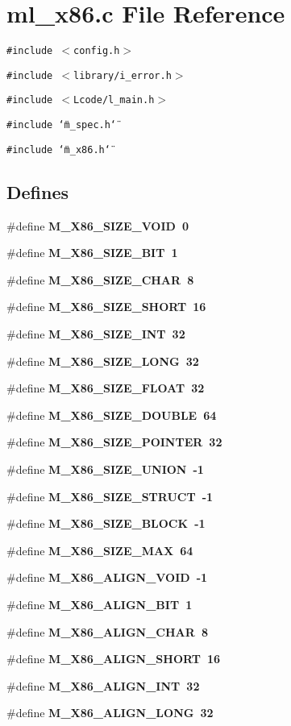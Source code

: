 \section{ml\_\-x86.c File Reference}
\label{ml__x86_8c}
{\tt \#include $<$config.h$>$}\par
{\tt \#include $<$library/i\_\-error.h$>$}\par
{\tt \#include $<$Lcode/l\_\-main.h$>$}\par
{\tt \#include \char`\"{}m\_\-spec.h\char`\"{}}\par
{\tt \#include \char`\"{}m\_\-x86.h\char`\"{}}\par
\subsection*{Defines}
\begin{CompactItemize}
\item 
\#define \bf{M\_\-X86\_\-SIZE\_\-VOID}~0
\item 
\#define \bf{M\_\-X86\_\-SIZE\_\-BIT}~1
\item 
\#define \bf{M\_\-X86\_\-SIZE\_\-CHAR}~8
\item 
\#define \bf{M\_\-X86\_\-SIZE\_\-SHORT}~16
\item 
\#define \bf{M\_\-X86\_\-SIZE\_\-INT}~32
\item 
\#define \bf{M\_\-X86\_\-SIZE\_\-LONG}~32
\item 
\#define \bf{M\_\-X86\_\-SIZE\_\-FLOAT}~32
\item 
\#define \bf{M\_\-X86\_\-SIZE\_\-DOUBLE}~64
\item 
\#define \bf{M\_\-X86\_\-SIZE\_\-POINTER}~32
\item 
\#define \bf{M\_\-X86\_\-SIZE\_\-UNION}~-1
\item 
\#define \bf{M\_\-X86\_\-SIZE\_\-STRUCT}~-1
\item 
\#define \bf{M\_\-X86\_\-SIZE\_\-BLOCK}~-1
\item 
\#define \bf{M\_\-X86\_\-SIZE\_\-MAX}~64
\item 
\#define \bf{M\_\-X86\_\-ALIGN\_\-VOID}~-1
\item 
\#define \bf{M\_\-X86\_\-ALIGN\_\-BIT}~1
\item 
\#define \bf{M\_\-X86\_\-ALIGN\_\-CHAR}~8
\item 
\#define \bf{M\_\-X86\_\-ALIGN\_\-SHORT}~16
\item 
\#define \bf{M\_\-X86\_\-ALIGN\_\-INT}~32
\item 
\#define \bf{M\_\-X86\_\-ALIGN\_\-LONG}~32

\end{CompactItemize}
